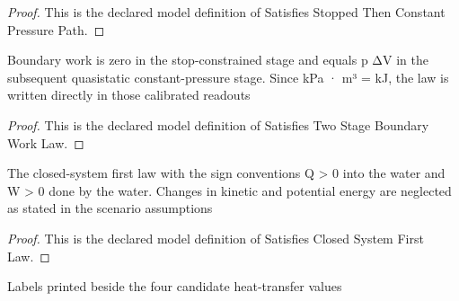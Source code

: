 \begin{proof}
  This is the declared model definition of Satisfies Stopped Then Constant Pressure Path.
\end{proof}
\begin{definition}
  \label{def:physics:phyx-mini-0463:phyxminiproblems-problemphyxmini0463-satisfiestwostageboundaryworklaw}
  Boundary work is zero in the stop-constrained stage and equals p ΔV in the subsequent quasistatic constant-pressure stage. Since kPa · m³ = kJ, the law is written directly in those calibrated readouts
\end{definition}
\begin{proof}
  This is the declared model definition of Satisfies Two Stage Boundary Work Law.
\end{proof}
\begin{definition}
  \label{def:physics:phyx-mini-0463:phyxminiproblems-problemphyxmini0463-satisfiesclosedsystemfirstlaw}
  The closed-system first law with the sign conventions Q > 0 into the water and W > 0 done by the water. Changes in kinetic and potential energy are neglected as stated in the scenario assumptions
\end{definition}
\begin{proof}
  This is the declared model definition of Satisfies Closed System First Law.
\end{proof}
\begin{definition}
  \label{def:physics:phyx-mini-0463:phyxminiproblems-problemphyxmini0463-answerchoice}
  Labels printed beside the four candidate heat-transfer values
\end{definition}
